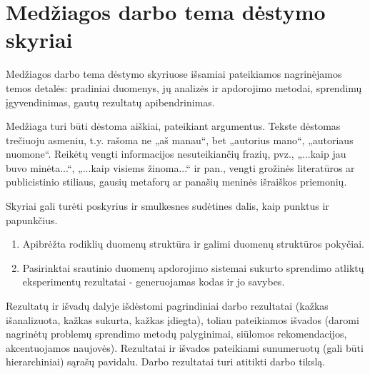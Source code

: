 \documentclass{VUMIFPSbakalaurinis}
\begin{document}
\section{Medžiagos darbo tema dėstymo skyriai}
Medžiagos darbo tema dėstymo skyriuose išsamiai pateikiamos nagrinėjamos temos
detalės: pradiniai duomenys, jų analizės ir apdorojimo metodai, sprendimų
įgyvendinimas, gautų rezultatų apibendrinimas.

Medžiaga turi būti dėstoma aiškiai, pateikiant argumentus. Tekste dėstomas
trečiuoju asmeniu, t.y. rašoma ne „aš manau“, bet „autorius mano“, „autoriaus
nuomone“. Reikėtų vengti informacijos nesuteikiančių frazių, pvz., „...kaip jau
buvo minėta...“, „...kaip visiems žinoma...“ ir pan., vengti grožinės
literatūros ar publicistinio stiliaus, gausių metaforų ar panašių meninės
išraiškos priemonių.

Skyriai gali turėti poskyrius ir smulkesnes sudėtines dalis, kaip punktus ir
papunkčius.


\begin{enumerate}
    \item Apibrėžta rodiklių duomenų struktūra ir galimi duomenų struktūros pokyčiai.
    \item Pasirinktai srautinio duomenų apdorojimo sistemai sukurto sprendimo atliktų eksperimentų rezultatai - generuojamas kodas ir jo savybes. 
\end{enumerate}

Rezultatų ir išvadų dalyje išdėstomi pagrindiniai darbo rezultatai (kažkas
išanalizuota, kažkas sukurta, kažkas įdiegta), toliau pateikiamos išvados
(daromi nagrinėtų problemų sprendimo metodų palyginimai, siūlomos
rekomendacijos, akcentuojamos naujovės). Rezultatai ir išvados pateikiami
sunumeruotų (gali būti hierarchiniai) sąrašų pavidalu. Darbo rezultatai turi
atitikti darbo tikslą.

\printbibliography[heading=bibintoc] 


\appendix 
\end{document}
